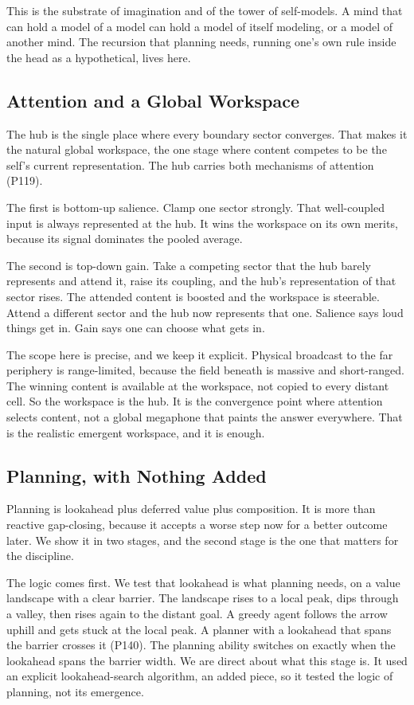 This is the substrate of imagination and of the tower of self-models. A mind that can hold a model of a model can hold a model of itself modeling, or a model of another mind. The recursion that planning needs, running one's own rule inside the head as a hypothetical, lives here.

\subsection{Attention and a Global Workspace}

The hub is the single place where every boundary sector converges. That makes it the natural global workspace, the one stage where content competes to be the self's current representation. The hub carries both mechanisms of attention (P119).

The first is bottom-up salience. Clamp one sector strongly. That well-coupled input is always represented at the hub. It wins the workspace on its own merits, because its signal dominates the pooled average.

The second is top-down gain. Take a competing sector that the hub barely represents and attend it, raise its coupling, and the hub's representation of that sector rises. The attended content is boosted and the workspace is steerable. Attend a different sector and the hub now represents that one. Salience says loud things get in. Gain says one can choose what gets in.

The scope here is precise, and we keep it explicit. Physical broadcast to the far periphery is range-limited, because the field beneath is massive and short-ranged. The winning content is available at the workspace, not copied to every distant cell. So the workspace is the hub. It is the convergence point where attention selects content, not a global megaphone that paints the answer everywhere. That is the realistic emergent workspace, and it is enough.

\subsection{Planning, with Nothing Added}

Planning is lookahead plus deferred value plus composition. It is more than reactive gap-closing, because it accepts a worse step now for a better outcome later. We show it in two stages, and the second stage is the one that matters for the discipline.

The logic comes first. We test that lookahead is what planning needs, on a value landscape with a clear barrier. The landscape rises to a local peak, dips through a valley, then rises again to the distant goal. A greedy agent follows the arrow uphill and gets stuck at the local peak. A planner with a lookahead that spans the barrier crosses it (P140). The planning ability switches on exactly when the lookahead spans the barrier width. We are direct about what this stage is. It used an explicit lookahead-search algorithm, an added piece, so it tested the logic of planning, not its emergence.

